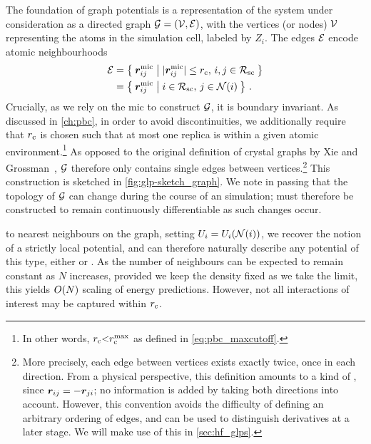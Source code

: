 The foundation of graph potentials is a representation of the system under consideration as a directed graph $\mathcal{G} = (\mathcal{V}, \mathcal{E})$, with the vertices (or nodes) $\mathcal{V}$ representing the atoms in the simulation cell, labeled by $Z_i$. The edges $\mathcal{E}$ encode atomic neighbourhoods
\begin{align}
    \edges &= \curlyset{\Rm_{ij}}{\magnitude{\Rm_{ij}} \leq \cutoff,\, i,j \in \Rsc} \\
           &= \curlyset{\Rm_{ij}}{i \in \Rsc,\, j \in \nbh{i}} \, .
\end{align}
Crucially, as we rely on the \gls{mic} to construct $\mathcal{G}$, it is boundary invariant.
As discussed in \cref{ch:pbc}, in order to avoid discontinuities, we additionally require that $r_{\text{c}}$ is chosen such that at most one replica is within a given atomic environment.\footnote[][2\baselineskip]{In other words, $r_{\text{c}}{<}r_{\text{c}}^{\text{max}}$ as defined in \cref{eq:pbc_maxcutoff}.} 
As opposed to the original definition of crystal graphs by Xie and Grossman~\cite{xg2018Aq}, $\mathcal{G}$ therefore only contains single edges between vertices.\footnote{More precisely, each edge between vertices exists exactly twice, once in each direction. From a physical perspective, this definition amounts to a kind of , since $\boldsymbol{r}_{ij}=-\boldsymbol{r}_{ji}$; no information is added by taking both directions into account. However, this convention avoids the difficulty of defining an arbitrary ordering of edges, and can be used to distinguish derivatives at a later stage. We will make use of this in \cref{sec:hf_glps}.}
This construction is sketched in \cref{fig:glp-sketch_graph}.
We note in passing that the topology of $\mathcal{G}$ can change during the course of an \md simulation; \glps must therefore be constructed to remain continuously differentiable as such changes occur.

 to nearest neighbours on the graph, setting $U_i = U_i(\mathcal{N}(i))$, we recover the notion of a strictly local potential, and can therefore naturally describe any potential of this type, either \mlps or \ffs.
As the number of neighbours can be expected to remain constant as $N$ increases, provided we keep the density fixed as we take the limit, this yields $O(N)$ scaling of energy predictions.
However, not all interactions of interest may be captured within $r_{\text{c}}$.

